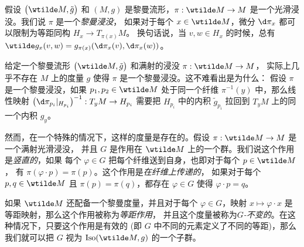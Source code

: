 假设 $\bigl(\wtilde M,\tilde g\bigr)$ 和 $(M,g)$ 是黎曼流形，$\pi:\wtilde M\to M$ 是一个光滑浸没。我们说 $\pi$ 是一个\emph{黎曼浸没}，
如果对于每个 $x\in\wtilde M$，微分 $\d\pi_x$ 都可以限制为等距同构 $H_x\to T_{\pi(x)}M$。
换句话说，当 $v,w\in H_x$ 的时候，总有 $\wtilde g_x(v,w)=g_{\pi(x)}(\d\pi_x(v),\d\pi_x(w))$。

给定一个黎曼流形 $\bigl(\wtilde M,\tilde g\bigr)$ 和满射的浸没 $\pi:\wtilde M\to M$，
实际上几乎不存在 $M$ 上的度量 $g$ 使得 $\pi$ 是一个黎曼浸没。这不难看出是为什么：
假设 $\pi$ 是一个黎曼浸没，如果 $p_1,p_2\in\wtilde M$ 处于同一个纤维 $\pi^{-1}(y)$
中，那么线性映射 $\bigl(\d\pi_{p_i}|_{H_{p_i}}\bigr)^{-1}:T_{y}M\to H_{p_i}$
需要把 $H_{p_i}$ 中的内积 $\tilde g_{p_i}$ 拉回到 $T_{y}M$ 上的同一个内积 $g_y$。

然而，在一个特殊的情况下，这样的度量是存在的。假设 $\pi:\wtilde M\to M$ 是一个满射光滑浸没，
并且 $G$ 是作用在 $\wtilde M$ 上的一个群。我们说这个作用是\emph{竖直的}，如果
每个 $\varphi\in G$ 把每个纤维送到自身，也即对于每个 $p\in\wtilde M$，
有 $\pi(\varphi\cdot p)=\pi(p)$。这个作用是\emph{在纤维上传递的}，
如果对于每个 $p,q\in\wtilde M$ 且 $\pi(p)=\pi(q)$，都存在 $\varphi\in G$ 使得 $\varphi\cdot p=q$。

如果 $\wtilde M$ 还配备一个黎曼度量，并且对于每个 $\varphi\in G$，映射
$x\mapsto \varphi\cdot x$ 是等距映射，那么这个作用被称为\emph{等距作用}，
并且这个度量被称为\emph{$G$-不变的}。在这种情况下，只要这个作用是有效的
(即 $G$ 中不同的元素定义了不同的等距)，那么我们就可以把 $G$ 视为 $\Iso(\wtilde M,g)$
的一个子群。

